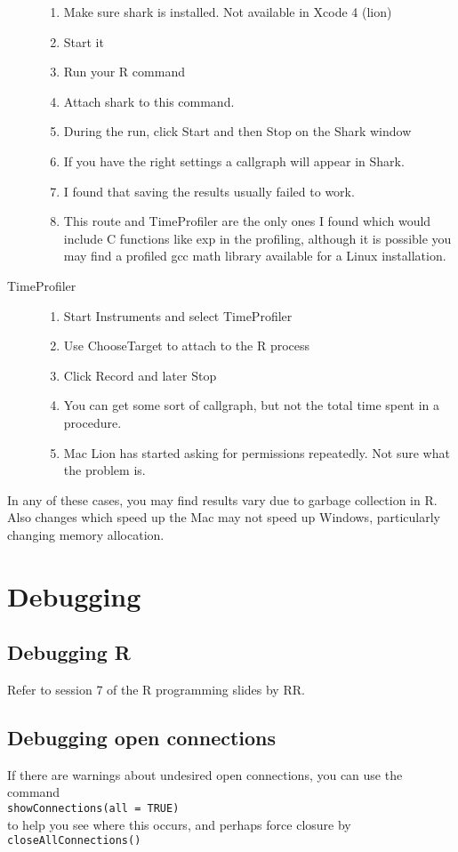 \documentclass[12pt, a4paper]{article}
\renewcommand{\=}{\,=\,}
\newcommand{\+}{\,+\,}
\begin{document}
\begin{description}
\begin{enumerate}
\item Make sure shark is installed. Not available in Xcode 4 (lion)
\item Start it
\item Run your R command
\item Attach shark to this command.
\item During the run, click Start and then Stop  on the Shark window
\item If you have the right settings a callgraph will appear in Shark.
\item I found that saving the results usually failed to work.
\item This route and TimeProfiler are the only ones I found which would include
  C functions like exp in the profiling, although it is possible you may find a
  profiled gcc math library available for a Linux installation.
\end{enumerate}
\item[TimeProfiler]
\begin{enumerate}
\item Start Instruments and select TimeProfiler
\item Use ChooseTarget to attach to the R process
\item Click Record and later Stop
\item You can get some sort of callgraph, but not the total time spent in a
  procedure.
\item Mac Lion has started asking for permissions repeatedly. Not sure what the
  problem is.
\end{enumerate}
\end{description}

In any of these cases, you may find results vary due to garbage
collection in R. Also changes which speed up the Mac may not speed up Windows,
particularly changing memory allocation.

\section{Debugging}

\subsection{Debugging R}
Refer to session 7 of the R programming slides by RR.

\subsection{Debugging open connections}
If there are warnings about undesired open connections,
you can use the command\\
\texttt{showConnections(all = TRUE)}\\
to help you see where this occurs, and perhaps force closure by
\\
\texttt{closeAllConnections()}\\
\end{document}
